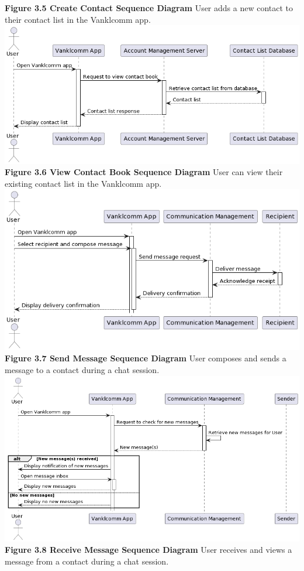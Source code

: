 \documentclass[]{article}
\begin{document}
\begin{center}
	\textbf{Figure 3.5 Create Contact Sequence Diagram}
	\newline User adds a new contact to their contact list in the Vanklcomm app.
	\includegraphics[width=\textwidth]{../images/SequenceDiagram/View_contact_book.png}
	\textbf{Figure 3.6 View Contact Book Sequence Diagram}
	\newline User can view their existing contact list in the Vanklcomm app.
	\includegraphics[width=\textwidth]{../images/SequenceDiagram/Send_message.png}
	\textbf{Figure 3.7 Send Message Sequence Diagram}
	\newline User composes and sends a message to a contact during a chat session.
	\includegraphics[width=\textwidth]{../images/SequenceDiagram/Receive_message.png}
	\textbf{Figure 3.8 Receive Message Sequence Diagram}
	\newline User receives and views a message from a contact during a chat session.
\end{center}
\newpage
\end{document}
